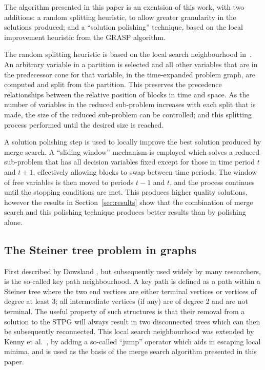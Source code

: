 \documentclass[journal]{IEEEtran}
\begin{document}
The algorithm presented in this paper is an exentsion of this work, with two additions: a random splitting heuristic, to allow greater granularity in the solutions produced; and a ``solution polishing'' technique, based on the local improvement heuristic from the GRASP algorithm.

The random splitting heuristic is based on the local search neighbourhood in~\cite{gecco18}. An arbitrary variable in a partition is selected and all other variables that are in the predecessor cone for that variable, in the time-expanded problem graph, are computed and split from the partition. This preserves the precedence relationships between the relative position of blocks in time and space. As the number of variables in the reduced sub-problem increases with each split that is made, the size of the reduced sub-problem can be controlled; and this splitting process performed until the desired size is reached.

A solution polishing step is used to locally improve the best solution produced by merge search. A ``sliding window'' mechanism is employed which solves a reduced sub-problem that has all decision variables fixed except for those in time period $t$ and $t+1$, effectively allowing blocks to swap between time periods. The window of free variables is then moved to periods $t-1$ and $t$, and the process continues until the stopping conditions are met. This produces higher quality solutions, however the results in Section~\ref{sec:results} show that the combination of merge search and this polishing technique produces better results than by polishing alone.

\subsection{The Steiner tree problem in graphs}


First described by Dowsland \cite{kp:dowsland}, but subsequently used widely by many researchers, is the so-called key path neighbourhood. A key path is defined as a path within a Steiner tree where the two end vertices are either terminal vertices or vertices of degree at least 3; all intermediate  vertices (if any) are of degree 2 and are not terminal. The useful property of such structures is that their removal from a solution to the STPG will always result in two disconnected trees which can then be subsequently reconnected. This local search neighbourhood was extended by Kenny et al.~\cite{gecco16}, by adding a so-called ``jump'' operator which aids in escaping local minima, and is used as the basis of the merge search algorithm presented in this paper.
\end{document}
